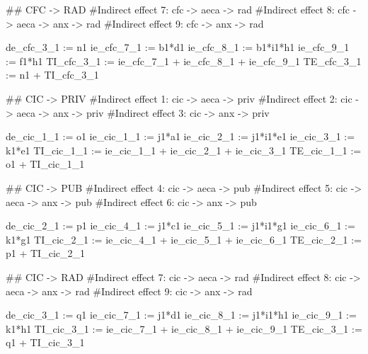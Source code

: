 \documentclass[
  letterpaper,
  DIV=11,
  numbers=noendperiod]{scrreprt}
\newenvironment{Shaded}{\begin{snugshade}}{\end{snugshade}}
\newcommand{\StringTok}[1]{\textcolor[rgb]{0.13,0.47,0.30}{#1}}
\begin{document}
\begin{Shaded}
\begin{Highlighting}[]
\StringTok{\#\# CFC {-}\textgreater{} RAD}
\StringTok{\#Indirect effect 7: cfc {-}\textgreater{} aeca {-}\textgreater{} rad}
\StringTok{\#Indirect effect 8: cfc {-}\textgreater{} aeca {-}\textgreater{} anx {-}\textgreater{} rad}
\StringTok{\#Indirect effect 9: cfc {-}\textgreater{} anx {-}\textgreater{} rad}

\StringTok{de\_cfc\_3\_1 := n1}
\StringTok{ie\_cfc\_7\_1 := b1*d1}
\StringTok{ie\_cfc\_8\_1 := b1*i1*h1}
\StringTok{ie\_cfc\_9\_1 := f1*h1}
\StringTok{TI\_cfc\_3\_1 := ie\_cfc\_7\_1 + ie\_cfc\_8\_1 + ie\_cfc\_9\_1}
\StringTok{TE\_cfc\_3\_1 := n1 + TI\_cfc\_3\_1}



\StringTok{\#\# CIC {-}\textgreater{} PRIV}
\StringTok{\#Indirect effect 1: cic {-}\textgreater{} aeca {-}\textgreater{} priv}
\StringTok{\#Indirect effect 2: cic {-}\textgreater{} aeca {-}\textgreater{} anx {-}\textgreater{} priv}
\StringTok{\#Indirect effect 3: cic {-}\textgreater{} anx {-}\textgreater{} priv}

\StringTok{de\_cic\_1\_1 := o1}
\StringTok{ie\_cic\_1\_1 := j1*a1}
\StringTok{ie\_cic\_2\_1 := j1*i1*e1}
\StringTok{ie\_cic\_3\_1 := k1*e1}
\StringTok{TI\_cic\_1\_1 := ie\_cic\_1\_1 + ie\_cic\_2\_1 + ie\_cic\_3\_1}
\StringTok{TE\_cic\_1\_1 := o1 + TI\_cic\_1\_1}


\StringTok{\#\# CIC {-}\textgreater{} PUB}
\StringTok{\#Indirect effect 4: cic {-}\textgreater{} aeca {-}\textgreater{} pub}
\StringTok{\#Indirect effect 5: cic {-}\textgreater{} aeca {-}\textgreater{} anx {-}\textgreater{} pub}
\StringTok{\#Indirect effect 6: cic {-}\textgreater{} anx {-}\textgreater{} pub}

\StringTok{de\_cic\_2\_1 := p1}
\StringTok{ie\_cic\_4\_1 := j1*c1}
\StringTok{ie\_cic\_5\_1 := j1*i1*g1}
\StringTok{ie\_cic\_6\_1 := k1*g1}
\StringTok{TI\_cic\_2\_1 := ie\_cic\_4\_1 + ie\_cic\_5\_1 + ie\_cic\_6\_1}
\StringTok{TE\_cic\_2\_1 := p1 + TI\_cic\_2\_1}


\StringTok{\#\# CIC {-}\textgreater{} RAD}
\StringTok{\#Indirect effect 7: cic {-}\textgreater{} aeca {-}\textgreater{} rad}
\StringTok{\#Indirect effect 8: cic {-}\textgreater{} aeca {-}\textgreater{} anx {-}\textgreater{} rad}
\StringTok{\#Indirect effect 9: cic {-}\textgreater{} anx {-}\textgreater{} rad}

\StringTok{de\_cic\_3\_1 := q1}
\StringTok{ie\_cic\_7\_1 := j1*d1}
\StringTok{ie\_cic\_8\_1 := j1*i1*h1}
\StringTok{ie\_cic\_9\_1 := k1*h1}
\StringTok{TI\_cic\_3\_1 := ie\_cic\_7\_1 + ie\_cic\_8\_1 + ie\_cic\_9\_1}
\StringTok{TE\_cic\_3\_1 := q1 + TI\_cic\_3\_1}




\end{Highlighting}
\end{Shaded}
\end{document}
